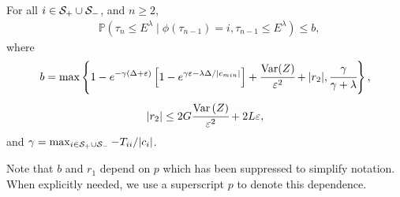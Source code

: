 \begin{lem}\label{lem: another bound}
	For all \(i\in\mathcal S_+\cup \mathcal{S}_-\), and \(n\geq 2\),
	\begin{align}
		&\mathbb P(\tau_n\leq E^\lambda \mid \phi(\tau_{n-1})=i, \tau_{n-1}\leq  E^\lambda ) \leq b,
	\end{align}
	where 
	\[b = \max\left\{1-e^{-\gamma(\Delta+\varepsilon)}\left[1-e^{\gamma\varepsilon-\lambda \Delta/|c_{min}|}\right] + \cfrac{\mathrm{Var}(Z)}{\varepsilon^2} + |r_2|,\cfrac{\gamma}{\gamma+\lambda}\right\},\]  
	\[|r_2|\leq 2G\cfrac{\mathrm{Var} \left(Z\right)}{\varepsilon^2} + 2L\varepsilon,\]
	and \(\gamma = \max_{i\in\mathcal{S}_+\cup\mathcal{S}_-}-T_{ii}/|c_i|\). 
\end{lem}
Note that \(b\) and \(r_1\) depend on \(p\) which has been suppressed to simplify notation. When explicitly needed, we use a superscript \(p\) to denote this dependence.  
